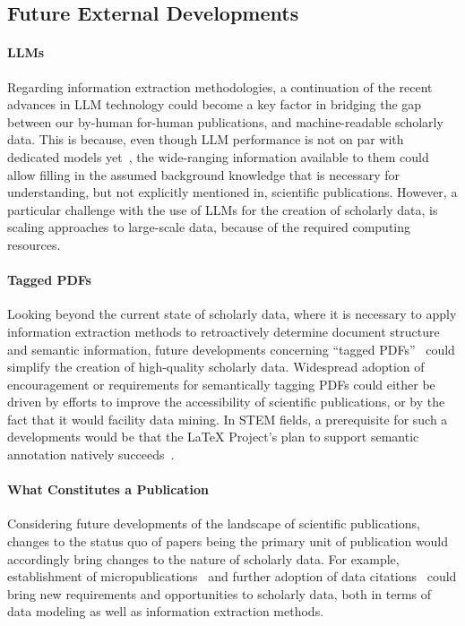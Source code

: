 
\subsection{Future External Developments}

\paragraph{LLMs}
Regarding information extraction methodologies, a continuation of the recent advances in LLM technology could become a key factor in bridging the gap between our by-human for-human publications, and machine-readable scholarly data.
This is because, even though LLM performance is not on par with dedicated models yet~\cite{Yang2023}, the wide-ranging information available to them could allow filling in the assumed background knowledge that is necessary for understanding, but not explicitly mentioned in, scientific publications.
However, a particular challenge with the use of LLMs for the creation of scholarly data, is scaling approaches to large-scale data, because of the required computing resources.

\paragraph{Tagged PDFs}
Looking beyond the current state of scholarly data, where it is necessary to apply information extraction methods to retroactively determine document structure and semantic information, future developments concerning ``tagged PDFs''~\cite{Lazar2017} could simplify the creation of high-quality scholarly data. Widespread adoption of encouragement or requirements for semantically tagging PDFs could either be driven by efforts to improve the accessibility of scientific publications, or by the fact that it would facility data mining. In STEM fields, a prerequisite for such a developments would be that the \LaTeX{} Project's plan to support semantic annotation natively succeeds~\cite{Mittelbach2020,Mittelbach2023}.

\paragraph{What Constitutes a Publication}
Considering future developments of the landscape of scientific publications, changes to the status quo of papers being the primary unit of publication would accordingly bring changes to the nature of scholarly data. For example, establishment of micropublications~\cite{Raciti2018} and further adoption of data citations~\cite{Kratz2015} could bring new requirements and opportunities to scholarly data, both in terms of data modeling as well as information extraction methods.

